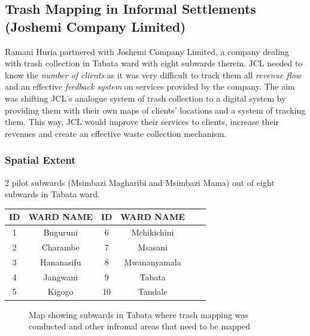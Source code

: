 \documentclass[a4paper,12pt,twoside]{article}
\begin{document}
\newpage
\subsection{Trash Mapping in Informal Settlements (Joshemi Company Limited)}

Ramani Huria partnered with Joshemi Company Limited, a company  dealing with trash collection in Tabata ward with eight subwards therein. JCL needed to know the \textit{number of clients} as it was very difficult to track them all \textit{revenue flow} and an effective \textit{feedback system} on services provided by the company. The aim was shifting JCL’s analogue system of trash collection to a digital system by providing them with their own maps of clients’ locations and a system of tracking them. This way, JCL would improve their services to clients, increase their revenues and create an effective waste collection mechanism.

\subsubsection {Spatial Extent}
2 pilot subwards (Msimbazi Magharibi and Msimbazi Mama) out of eight subwards in Tabata ward.

\begin{center}
\begin{tabular}{|c|c|c|c|c|c|}
\hline
ID & WARD NAME & ID & WARD NAME\\
\hline
1  & Buguruni & 6  & Mchikichini\\
2 &  Charambe & 7  & Msasani\\
3  & Hananasifu & 8  & Mwananyamala\\
4  & Jangwani & 9  & Tabata\\
5  & Kigogo & 10  & Tandale\\
 \hline
\end{tabular}
\end{center}

\begin{figure}[h]
  \caption{Map showing subwards in Tabata where trash mapping was conducted and other infromal areas that need to be mapped}
  \centering
\end{figure}
\end{document}
